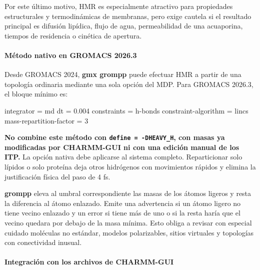 \documentclass[
  spanish,
  11pt,
  a4paper]{article}
\newenvironment{Shaded}{\begin{snugshade}}{\end{snugshade}}
\newcommand{\DataTypeTok}[1]{\textcolor[rgb]{0.13,0.29,0.53}{#1}}
\newcommand{\DecValTok}[1]{\textcolor[rgb]{0.00,0.00,0.81}{#1}}
\newcommand{\FloatTok}[1]{\textcolor[rgb]{0.00,0.00,0.81}{#1}}
\newcommand{\OtherTok}[1]{\textcolor[rgb]{0.56,0.35,0.01}{#1}}
\newcommand{\StringTok}[1]{\textcolor[rgb]{0.31,0.60,0.02}{#1}}
\begin{document}
Por este último motivo, HMR es especialmente atractivo para propiedades
estructurales y termodinámicas de membranas, pero exige cautela si el
resultado principal es difusión lipídica, flujo de agua, permeabilidad
de una acuaporina, tiempos de residencia o cinética de apertura.

\paragraph{Método nativo en GROMACS
2026.3}\label{muxe9todo-nativo-en-gromacs-2026.3}

Desde GROMACS 2024, \textbf{gmx grompp} puede efectuar HMR a partir de
una topología ordinaria mediante una sola opción del MDP. Para GROMACS
2026.3, el bloque mínimo es:

\begin{Shaded}
\begin{Highlighting}[]
\DataTypeTok{integrator              }\OtherTok{=}\StringTok{ md}
\DataTypeTok{dt                      }\OtherTok{=}\StringTok{ }\FloatTok{0.004}
\DataTypeTok{constraints             }\OtherTok{=}\StringTok{ h{-}bonds}
\DataTypeTok{constraint{-}algorithm    }\OtherTok{=}\StringTok{ lincs}
\DataTypeTok{mass{-}repartition{-}factor }\OtherTok{=}\StringTok{ }\DecValTok{3}
\end{Highlighting}
\end{Shaded}

\textbf{No combine este método con \texttt{define\ =\ -DHEAVY\_H}, con
masas ya modificadas por CHARMM-GUI ni con una edición manual de los
ITP.} La opción nativa debe aplicarse al sistema completo. Reparticionar
solo lípidos o solo proteína deja otros hidrógenos con movimientos
rápidos y elimina la justificación física del paso de 4 fs.

\textbf{grompp} eleva al umbral correspondiente las masas de los átomos
ligeros y resta la diferencia al átomo enlazado. Emite una advertencia
si un átomo ligero no tiene vecino enlazado y un error si tiene más de
uno o si la resta haría que el vecino quedara por debajo de la masa
mínima. Esto obliga a revisar con especial cuidado moléculas no
estándar, modelos polarizables, sitios virtuales y topologías con
conectividad inusual.

\paragraph{Integración con los archivos de
CHARMM-GUI}\label{integraciuxf3n-con-los-archivos-de-charmm-gui}
\end{document}
